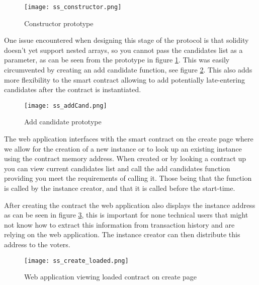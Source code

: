 \documentclass{entcs}
\begin{document}
\begin{figure}[h!]
    \centering
    \texttt{[image: ss\_constructor.png]}
    \caption{Constructor prototype}
    \label{fig:constructor}
\end{figure}


One issue encountered when designing this stage of the protocol is that solidity doesn't yet support nested arrays, so you cannot pass the candidates list as a parameter, as can be seen from the prototype in figure \ref{fig:constructor}. This was easily circumvented by creating an add candidate function, see figure \ref{fig:addCand}. This also adds more flexibility to the smart contract allowing to add potentially late-entering candidates after the contract is instantiated. 

\begin{figure}[h!]
    \centering
    \texttt{[image: ss\_addCand.png]}
    \caption{Add candidate prototype}
    \label{fig:addCand}
\end{figure}

The web application interfaces with the smart contract on the create page where we allow for the creation of a new instance or to look up an existing instance using the contract memory address. When created or by looking a contract up you can view current candidates list and call the add candidates function providing you meet the requirements of calling it. Those being that the function is called by the instance creator, and that it is called before the start-time.

After creating the contract the web application also displays the instance address as can be seen in figure \ref{fig:create_loaded}, this is important for none technical users that might not know how to extract this information from transaction history and are relying on the web application. The instance creator can then distribute this address to the voters.

\begin{figure}[h!]
    \centering
    \texttt{[image: ss\_create\_loaded.png]}
    \caption{Web application viewing loaded contract on create page}
    \label{fig:create_loaded}
\end{figure}

\end{document}

